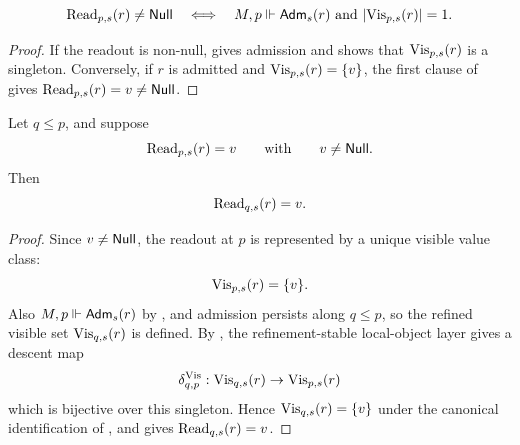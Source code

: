 \begin{corollary}\label{cor:nonnull-readout-criterion}
\[
\mathrm{Read}_{p,s}(r)\neq\mathsf{Null}
\quad\Longleftrightarrow\quad
M,p\Vdash \mathsf{Adm}_s(r)\ \text{and}\ |\mathrm{Vis}_{p,s}(r)|=1.
\]
\end{corollary}

\begin{proof}
If the readout is non-null,  gives admission
and shows that $\mathrm{Vis}_{p,s}(r)$ is a singleton. Conversely, if $r$ is admitted
and $\mathrm{Vis}_{p,s}(r)=\{v\}$, the first clause of  gives
$\mathrm{Read}_{p,s}(r)=v\neq\mathsf{Null}$.
\end{proof}

\begin{proposition}\label{prop:typed-readout-persistence}
Let $q\le p$, and suppose
\[
\mathrm{Read}_{p,s}(r)=v
\qquad\text{with}\qquad
v\neq \mathsf{Null}.
\]
Then
\[
\mathrm{Read}_{q,s}(r)=v.
\]
\end{proposition}

\begin{proof}
Since $v\neq\mathsf{Null}$, the readout at $p$ is represented by a unique visible value
class:
\[
\mathrm{Vis}_{p,s}(r)=\{v\}.
\]
Also $M,p\Vdash\mathsf{Adm}_s(r)$ by , and admission
persists along $q\le p$, so the refined visible set $\mathrm{Vis}_{q,s}(r)$ is defined.
By , the refinement-stable
local-object layer gives a descent map
\[
\delta_{q,p}^{\mathrm{Vis}}:\mathrm{Vis}_{q,s}(r)\to\mathrm{Vis}_{p,s}(r)
\]
which is bijective over this singleton. Hence $\mathrm{Vis}_{q,s}(r)=\{v\}$ under the
canonical identification of , and
 gives $\mathrm{Read}_{q,s}(r)=v$.
\end{proof}



